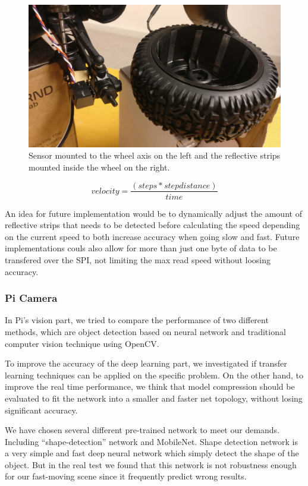\documentclass[11pt, titlepage]{article} %
\begin{document}
\begin{figure}[]
	\centering
   	\includegraphics[scale=0.5]{speedometer.jpg}
   	\caption{Sensor mounted to the wheel axis on the left and the reflective strips mounted inside the wheel on the right.}
    \label{fig:speedometer}
\end{figure}

\begin{equation}
    velocity = \frac{(steps*stepdistance)}{time}
    \label{eq:velocity}
\end{equation}

An idea for future implementation would be to dynamically adjust the amount of reflective strips that needs to be detected before calculating the speed depending on the current speed to both increase accuracy when going slow and fast. Future implementations couls also allow for more than just one byte of data to be transfered over the SPI, not limiting the max read speed without loosing accuracy.

\subsubsection{Pi Camera}
In Pi’s vision part, we tried to compare the performance of two different methods, which are object detection based on neural network and traditional computer vision technique using OpenCV.

To improve the accuracy of the deep learning part, we investigated if transfer learning techniques can be applied on the specific problem. On the other hand, to improve the real time performance, we think that model compression should be evaluated to fit the network into a smaller and faster net topology, without losing significant accuracy. 

We have chosen several different pre-trained network to meet our demands. Including “shape-detection” network and MobileNet. Shape detection network is a very simple and fast deep neural network which simply detect the shape of the object. But in the real test we found that this network is not robustness enough for our fast-moving scene since it frequently predict wrong results.
\end{document}
